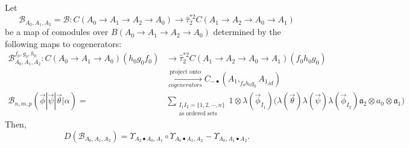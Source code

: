 %
\begin{prop} \label{prop:c4}
Let 
$$
\mathcal{B}_{A_0,A_1,A_2} = \mathcal{B}: 
C(A_0 \to A_1 \to A_2 \to A_0)
\to \hat{\tau}_2^{*2}C(A_1 \to A_2 \to A_0 \to A_1)
$$ 
be a map of comodules over 
$B(A_0 \to A_1 \to A_2 \to A_0)$ 
determined by the following maps to 
cogenerators:
\begin{equation}
\label{eq:def_sigma2}
\begin{split}
\mathcal{B}^{f_0, g_0,h_0}_{A_0,A_1,A_2}: 
  C(A_0 \to A_1 \to A_0)(h_0g_0f_0) 
&\to
\hat{\tau}_2^{*2}C(A_1 \to A_2 \to A_0 \to A_1)
  (f_0h_0g_0)\\
&\xrightarrow[cogenerators]{\textrm{project onto}}
C_{-\bullet}(A_1, _{f_0h_0g_0}{A_1}_{id})\\
\mathcal{B}_{n, m, p} (\vec{\phi} | \vec{\psi} | \vec{\theta} | \alpha) 
= & \sum_{\substack{I_1I_2 = \{1,2,\cdots,n\} \\
                          \textrm{as ordered sets}}}
  1 \otimes \lambda(\vec{\phi}_{I_1})\big( \lambda(\vec{\theta}) \lambda(\vec{\psi}) \lambda(\vec{\phi}_{I_2})
  \mathfrak{a}_2 \otimes a_0 \otimes \mathfrak{a}_1 \big)
\end{split}      
\end{equation}
Then, 
\begin{equation} \label{eq:prop4}
D(\mathcal{B}_{A_0,A_1,A_2}) = 
  \Upsilon_{A_2\bullet A_0, A_1} \circ
  \Upsilon_{A_0\bullet A_1, A_2} 
   - \Upsilon_{A_0, A_1\bullet A_2}.
\end{equation}
\end{prop}

